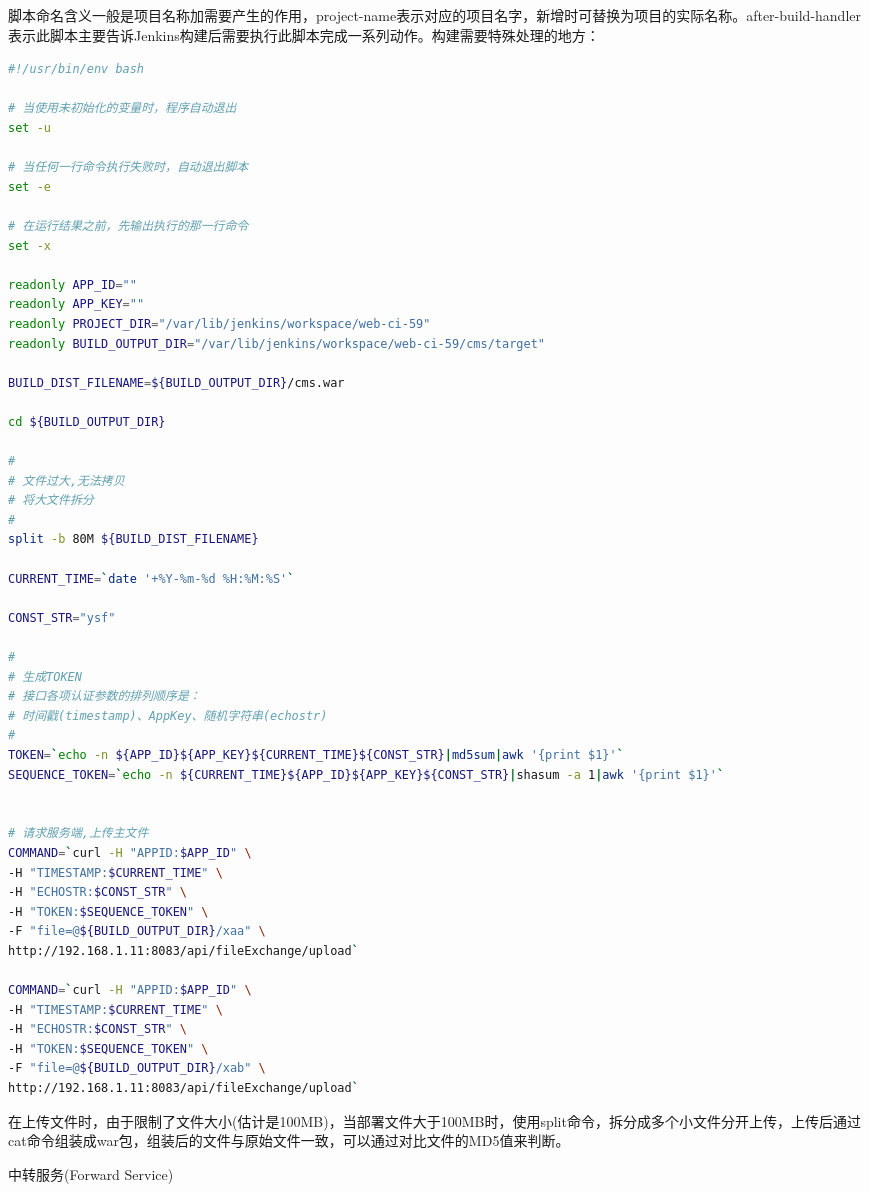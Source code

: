 \documentclass[8pt]{book}
\makeatletter
\numberwithin{dummy}{section}
\theoremstyle{ocrenumbox}
\theoremstyle{blacknumex}
\theoremstyle{blacknumbox}
\theoremstyle{ocrenum}
\renewcommand{\subsubsection}{\@startsection {subsubsection}{3}{\z@}
	{-2ex \@plus -0.1ex \@minus -.2ex}
	{.2ex \@plus.2ex }
	{\normalfont\small\sffamily\bfseries}}
\makeatother
\begin{document}
脚本命名含义一般是项目名称加需要产生的作用，project-name表示对应的项目名字，新增时可替换为项目的实际名称。after-build-handler表示此脚本主要告诉Jenkins构建后需要执行此脚本完成一系列动作。构建需要特殊处理的地方：


\begin{lstlisting}[language=Bash]
#!/usr/bin/env bash

# 当使用未初始化的变量时，程序自动退出
set -u

# 当任何一行命令执行失败时，自动退出脚本
set -e

# 在运行结果之前，先输出执行的那一行命令
set -x

readonly APP_ID=""
readonly APP_KEY=""
readonly PROJECT_DIR="/var/lib/jenkins/workspace/web-ci-59"
readonly BUILD_OUTPUT_DIR="/var/lib/jenkins/workspace/web-ci-59/cms/target"

BUILD_DIST_FILENAME=${BUILD_OUTPUT_DIR}/cms.war

cd ${BUILD_OUTPUT_DIR}

#
# 文件过大,无法拷贝
# 将大文件拆分
#
split -b 80M ${BUILD_DIST_FILENAME}

CURRENT_TIME=`date '+%Y-%m-%d %H:%M:%S'`

CONST_STR="ysf"

#
# 生成TOKEN
# 接口各项认证参数的排列顺序是：
# 时间戳(timestamp)、AppKey、随机字符串(echostr)
#
TOKEN=`echo -n ${APP_ID}${APP_KEY}${CURRENT_TIME}${CONST_STR}|md5sum|awk '{print $1}'`
SEQUENCE_TOKEN=`echo -n ${CURRENT_TIME}${APP_ID}${APP_KEY}${CONST_STR}|shasum -a 1|awk '{print $1}'`


# 请求服务端,上传主文件
COMMAND=`curl -H "APPID:$APP_ID" \
-H "TIMESTAMP:$CURRENT_TIME" \
-H "ECHOSTR:$CONST_STR" \
-H "TOKEN:$SEQUENCE_TOKEN" \
-F "file=@${BUILD_OUTPUT_DIR}/xaa" \
http://192.168.1.11:8083/api/fileExchange/upload`

COMMAND=`curl -H "APPID:$APP_ID" \
-H "TIMESTAMP:$CURRENT_TIME" \
-H "ECHOSTR:$CONST_STR" \
-H "TOKEN:$SEQUENCE_TOKEN" \
-F "file=@${BUILD_OUTPUT_DIR}/xab" \
http://192.168.1.11:8083/api/fileExchange/upload`
\end{lstlisting}

在上传文件时，由于限制了文件大小(估计是100MB)，当部署文件大于100MB时，使用split命令，拆分成多个小文件分开上传，上传后通过cat命令组装成war包，组装后的文件与原始文件一致，可以通过对比文件的MD5值来判断。

\subsubsection{中转服务(Forward Service)}
\end{document}
